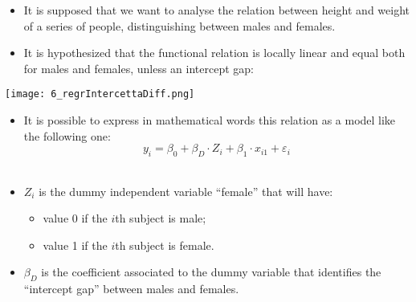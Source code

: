 
\begin{frame}
  \vspace*{.25cm}
  \begin{itemize}
    \item It is supposed that we want to analyse the relation between height and weight of a series of people, distinguishing between males and females.
    \item It is hypothesized that the functional relation is locally linear and equal both for males and females, unless an intercept gap:
  \end{itemize}
  \begin{center}
    \texttt{[image: 6\_regrIntercettaDiff.png]}
  \end{center}
\end{frame}

\begin{frame}
  \vspace*{.25cm}
  \begin{itemize}
    \item It is possible to express in mathematical words this relation as a model like the following one:
    \vspace{-0.3cm} $$ y_i = \beta_0 + \beta_D \cdot Z_i + \beta_1 \cdot x_{i1} + \varepsilon_i $$\\
    \vspace{0.2cm}
    \item $Z_i$ is the dummy independent variable ``female'' that will have:
    \begin{itemize}
      \item value 0 if the $i$th subject is male;
      \item value 1 if the $i$th subject is female.
    \end{itemize}
    \vspace{0.25cm}
    \item $ \beta_D $ is the coefficient associated to the dummy variable that identifies the ``intercept gap'' between males and females.
  \end{itemize}
\end{frame}

